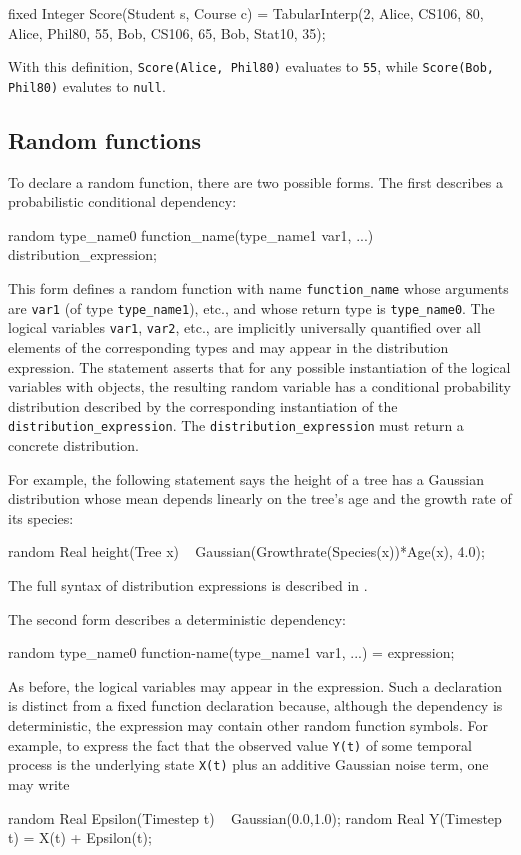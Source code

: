 \begin{blogcode}
fixed Integer Score(Student s, Course c)
  = TabularInterp(2, Alice, CS106, 80,
                     Alice, Phil80, 55,
                     Bob, CS106, 65,
                     Bob, Stat10, 35);
\end{blogcode}

With this definition, {\tt Score(Alice, Phil80)} evaluates to \verb|55|, while
{\tt Score(Bob, Phil80)} evalutes to \verb|null|.



\subsection{Random functions}\label{random-function-section}

To declare a random function, there are two possible forms. The first describes a probabilistic
conditional dependency:
\begin{blogcode}
random type_name0 function_name(type_name1 var1, ...) ~ 
  distribution_expression;
\end{blogcode}
This form defines a random function with name \texttt{function\_name} whose arguments are {\tt var1} (of type \verb|type_name1|), etc.,
and whose return type is \verb|type_name0|. The logical variables {\tt var1}, {\tt var2}, etc., are implicitly universally quantified over
all elements of the corresponding types and may appear in the distribution expression. The statement asserts that for any possible instantiation of the
logical variables with objects, the resulting random variable has a conditional probability distribution
described by the corresponding instantiation of the {\tt distribution\_expression}. The {\tt distribution\_expression} must return a concrete distribution. 

For example, the following statement says the height of a tree has a Gaussian distribution
whose mean depends linearly on the tree's age and the growth rate of its species:
\begin{blogcode}
random Real height(Tree x) ~
    Gaussian(Growthrate(Species(x))*Age(x), 4.0);
\end{blogcode}
The full syntax of distribution expressions is described in .

The second form describes a deterministic dependency:
\begin{blogcode}
random type_name0 function-name(type_name1 var1, ...) = expression;
\end{blogcode}
As before, the logical variables may appear in the expression.
Such a declaration is distinct from a fixed function declaration because, although the dependency is deterministic,
the expression may contain other random function symbols. For example, 
to express the fact that the observed value {\tt Y(t)} of some temporal process 
is the underlying state {\tt X(t)} plus an additive Gaussian noise term, one may write
\begin{blogcode}
random Real Epsilon(Timestep t) ~ Gaussian(0.0,1.0);
random Real Y(Timestep t) = X(t) + Epsilon(t);
\end{blogcode}
